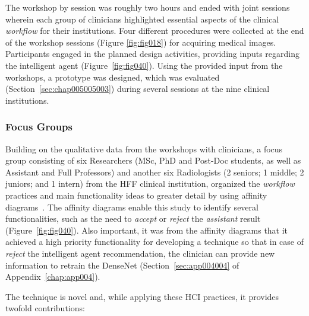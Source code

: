 
The workshop by session was roughly two hours and ended with joint sessions wherein each group of clinicians highlighted essential aspects of the clinical {\it workflow} for their institutions.
Four different procedures were collected at the end of the workshop sessions (Figure \ref{fig:fig018}) for acquiring medical images.
Participants engaged in the planned design activities, providing inputs regarding the intelligent agent (Figure~\ref{fig:fig040}).
Using the provided input from the workshops, a prototype was designed, which was evaluated (Section~\ref{sec:chap005005003}) during several sessions at the nine clinical institutions.

\subsubsection{Focus Groups}
\label{sec:chap005003003002}

Building on the qualitative data from the workshops with clinicians, a focus group consisting of six Researchers (\acs{MSc}, \acs{PhD} and Post-Doc students, as well as Assistant and Full Professors) and another six Radiologists (2 seniors; 1 middle; 2 juniors; and 1 intern) from the \acs{HFF} clinical institution, organized the {\it workflow} practices and main functionality ideas to greater detail by using affinity diagrams~\cite{CALISTO2021102607}.
The affinity diagrams enable this study to identify several functionalities, such as the need to {\it accept} or {\it reject} the {\it assistant} result (Figure~\ref{fig:fig040}).
Also important, it was from the affinity diagrams that it achieved a high priority functionality for developing a technique so that in case of {\it reject} the intelligent agent recommendation, the clinician can provide new information to retrain the DenseNet (Section~\ref{sec:app004004} of Appendix~\ref{chap:app004}).

\noindent
The technique is novel and, while applying these \ac{HCI} practices, it provides twofold contributions:

\vspace{0.50mm}


